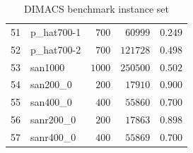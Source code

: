 \documentclass[draft,final]{vutinfth} %
\begin{document}
\begin{table}
{\begin{tabular}{|r|l|r|r|r|}
        51 & p\_hat700-1 & $700$ & $60999$ & $0.249$\\
        52 & p\_hat700-2 & $700$ & $121728$ & $0.498$\\
        53 & san1000 & $1000$ & $250500$ & $0.502$\\
        54 & san200\_0 & $200$ & $17910$ & $0.900$\\
        55 & san400\_0 & $400$ & $55860$ & $0.700$\\
        56 & sanr200\_0 & $200$ & $17863$ & $0.898$\\
        57 & sanr400\_0 & $400$ & $55869$ & $0.700$\\ \hline
    \end{tabular}
    }     
    \caption{DIMACS benchmark instance set}   
    \label{tab:DIMACS}
\end{table}
\end{document}
